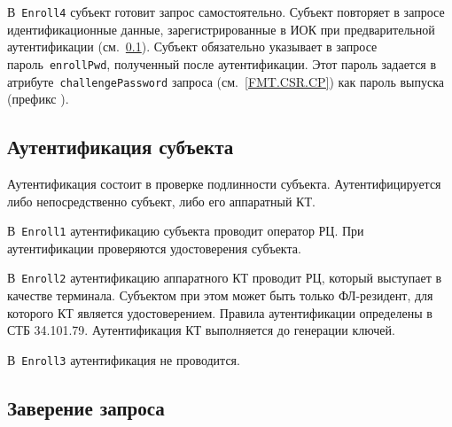 
В~\texttt{Enroll4} субъект готовит запрос самостоятельно.
Субъект повторяет в запросе идентификационные данные, 
зарегистрированные в ИОК при предварительной аутентификации
(см.~\ref{PROCESSES.Enroll.Auth}).
%
Субъект обязательно указывает в запросе пароль~\texttt{enrollPwd}, 
полученный после аутентификации. Этот пароль задается в 
атрибуте~\texttt{challengePassword} запроса 
(см.~\ref{FMT.CSR.CP}) как пароль выпуска (префикс ).

\subsection{Аутентификация субъекта}\label{PROCESSES.Enroll.Auth}

Аутентификация состоит в проверке подлинности субъекта.
Аутентифицируется либо непосредственно субъект, либо его аппаратный КТ. 

В~\texttt{Enroll1} аутентификацию субъекта проводит оператор РЦ.
При аутентификации проверяются удостоверения субъекта. 

В~\texttt{Enroll2} аутентификацию аппаратного КТ проводит РЦ, который 
выступает в качестве терминала. Субъектом при этом может быть только 
ФЛ-резидент, для которого КТ является удостоверением. Правила аутентификации 
определены в СТБ 34.101.79. Аутентификация КТ выполняется до генерации 
ключей.

В~\texttt{Enroll3} аутентификация не проводится.



\subsection{Заверение запроса}\label{PROCESSES.Enroll.Signed}

